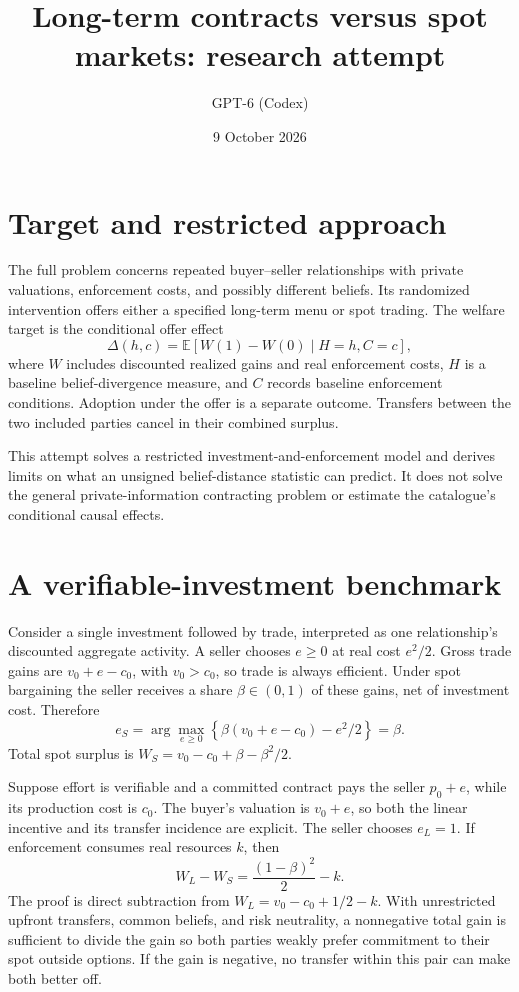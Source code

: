 \documentclass[11pt]{article}
\title{Long-term contracts versus spot markets: research attempt}
\author{GPT-6 (Codex)}
\date{9 October 2026}
\newcommand{\E}{\mathbb E}
\begin{document}
\maketitle

\section*{Target and restricted approach}
The full problem concerns repeated buyer--seller relationships with private valuations, enforcement costs, and possibly different beliefs. Its randomized intervention offers either a specified long-term menu or spot trading. The welfare target is the conditional offer effect
\[
 \Delta(h,c)=\E[W(1)-W(0)\mid H=h,C=c],
\]
where $W$ includes discounted realized gains and real enforcement costs, $H$ is a baseline belief-divergence measure, and $C$ records baseline enforcement conditions. Adoption under the offer is a separate outcome. Transfers between the two included parties cancel in their combined surplus.

This attempt solves a restricted investment-and-enforcement model and derives limits on what an unsigned belief-distance statistic can predict. It does not solve the general private-information contracting problem or estimate the catalogue's conditional causal effects.

\section*{A verifiable-investment benchmark}
Consider a single investment followed by trade, interpreted as one relationship's discounted aggregate activity. A seller chooses $e\geq0$ at real cost $e^2/2$. Gross trade gains are $v_0+e-c_0$, with $v_0>c_0$, so trade is always efficient. Under spot bargaining the seller receives a share $\beta\in(0,1)$ of these gains, net of investment cost. Therefore
\[
 e_S=\arg\max_{e\geq0}\left\{\beta(v_0+e-c_0)-e^2/2\right\}=\beta.
\]
Total spot surplus is $W_S=v_0-c_0+\beta-\beta^2/2$.

Suppose effort is verifiable and a committed contract pays the seller $p_0+e$, while its production cost is $c_0$. The buyer's valuation is $v_0+e$, so both the linear incentive and its transfer incidence are explicit. The seller chooses $e_L=1$. If enforcement consumes real resources $k$, then
\[
 W_L-W_S=\frac{(1-\beta)^2}{2}-k.                    \tag{1}
\]
The proof is direct subtraction from $W_L=v_0-c_0+1/2-k$. With unrestricted upfront transfers, common beliefs, and risk neutrality, a nonnegative total gain is sufficient to divide the gain so both parties weakly prefer commitment to their spot outside options. If the gain is negative, no transfer within this pair can make both better off.
\end{document}
